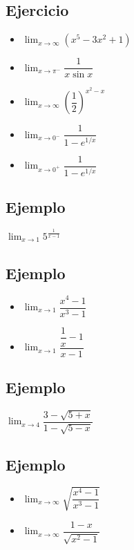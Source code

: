 \documentclass[10pt, a4paper]{article}
\begin{document}
\subsection{Ejercicio}
\label{1.19}
\begin{itemize}
\item \(\displaystyle\lim_{ {x} \rightarrow {\infty} } {\left( x^5-3x^2+1 \right)}\)
\item \(\displaystyle\lim_{ {x} \rightarrow {\pi^-} } {\dfrac{1}{x\sin x}}\)
\item \(\displaystyle\lim_{ {x} \rightarrow {\infty} } {\left( \dfrac{1}{2} \right)^{x^2-x}}\)
\end{itemize}
\begin{itemize}
\item \(\displaystyle\lim_{ {x} \rightarrow {0^-} } {\dfrac{1}{1-e^{1/x}}}\)
\item \(\displaystyle\lim_{ {x} \rightarrow {0^+} } {\dfrac{1}{1-e^{1/x}}}\)
\end{itemize}
\subsection{Ejemplo}
\label{1.20}
\(\displaystyle\lim_{ {x} \rightarrow {1} } {5^{\frac{1}{x-1}}}\)
\subsection{Ejemplo}
\label{1.21}
\begin{itemize}
\item \(\displaystyle\lim_{ {x} \rightarrow {1} } {\dfrac{x^4-1}{x^3-1}}\)
\item \(\displaystyle\lim_{ {x} \rightarrow {1} } {\dfrac{\dfrac{1}{x}-1}{x-1}}\)
\end{itemize}
\subsection{Ejemplo}
\label{sec:org5aa4405}
\(\displaystyle\lim_{ {x} \rightarrow {4} } {\dfrac{3-\sqrt{5+x}}{1-\sqrt{5-x}}}\)
\subsection{Ejemplo}
\label{sec:org86a9c87}
\begin{itemize}
\item \(\displaystyle\lim_{ {x} \rightarrow {\infty} } {\sqrt{ \dfrac{x^4-1}{x^3-1} }}\)
\item \(\displaystyle\lim_{ {x} \rightarrow {\infty} } {\dfrac{1-x}{\sqrt{x^2-1}}}\)
\end{itemize}
\end{document}
